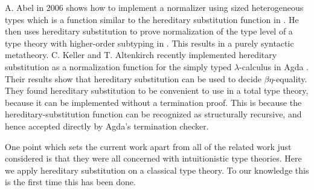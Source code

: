 A. Abel in 2006 shows how to implement a normalizer using sized
heterogeneous types which is a function similar to the hereditary
substitution function in \cite{Abel:2006}.  He then uses hereditary
substitution to prove normalization of the type level of a type theory
with higher-order subtyping in \cite{Abel:2008}.  This results in a
purely syntactic metatheory.  C. Keller and T. Altenkirch recently
implemented hereditary substitution as a normalization function for
the simply typed $\lambda$-calculus in Agda \cite{Keller:2010}.  Their
results show that hereditary substitution can be used to decide $\beta
\eta$-equality.  They found hereditary substitution to be convenient
to use in a total type theory, because it can be implemented without a
termination proof.  This is because the hereditary-substitution
function can be recognized as structurally recursive, and hence
accepted directly by Agda's termination checker.

One point which sets the current work apart from all of the related
work just considered is that they were all concerned with
intuitionistic type theories.  Here we apply hereditary substitution
on a classical type theory.  To our knowledge this is the first time
this has been done.
